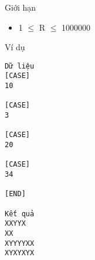 Giới hạn  
\begin{itemize}
	\item     1  $\le$  R  $\le$  1000000   
\end{itemize}
   Ví dụ  
\begin{verbatim}
Dữ liệu
[CASE]
10

[CASE]
3

[CASE]
20

[CASE]
34

[END]

Kết quả
XXYYX
XX
XYYYYXX
XYXYXYX
\end{verbatim}